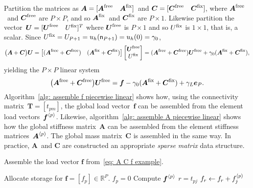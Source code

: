 Partition the matrices as
$\boldsymbol{A}=[\boldsymbol{A}^{\mathrm{free}}\quad\boldsymbol{A}^{\mathrm{fix}}]$~and
$\boldsymbol{C}=[\boldsymbol{C}^{\mathrm{free}}\quad\boldsymbol{C}^{\mathrm{fix}}]$, where
$\boldsymbol{A}^{\mathrm{free}}$~and $\boldsymbol{C}^{\mathrm{free}}$ are $P\times P$, and so
$\boldsymbol{A}^{\mathrm{fix}}$~and $\boldsymbol{C}^{\mathrm{fix}}$ are $P\times1$.  Likewise
partition the vector~$\boldsymbol{U}=[\boldsymbol{U}^{\mathrm{free}}\quad U^{\mathrm{fix}}]^T$ where
$\boldsymbol{U}^{\mathrm{free}}$ is $P\times1$ and so $U^{\mathrm{fix}}$ is $1\times1$, that is, a
scalar.  Since $U^{\mathrm{fix}}=U_{P+1}=u_h(\mathsf{n}_{P+1})=u_h(0)=\gamma_0$,
\[
\bigl(\boldsymbol{A}+\boldsymbol{C}\bigr)\boldsymbol{U}
    =\bigl[(\boldsymbol{A}^{\mathrm{free}}+\boldsymbol{C}^{\mathrm{free}})\quad
    (\boldsymbol{A}^{\mathrm{fix}}+\boldsymbol{C}^{\mathrm{fix}})\bigr]
    \begin{bmatrix}\boldsymbol{U}^{\mathrm{free}}\\ U^{\mathrm{fix}}\end{bmatrix}
    =(\boldsymbol{A}^{\mathrm{free}}+\boldsymbol{C}^{\mathrm{free}})\boldsymbol{U}^{\mathrm{free}}
    +\gamma_0(\boldsymbol{A}^{\mathrm{fix}}+\boldsymbol{C}^{\mathrm{fix}}),
\]
yielding the $P\times P$ linear system
\begin{equation}\label{eq: FEM 1d mixed linear system}
\bigl(\boldsymbol{A}^{\mathrm{free}}+\boldsymbol{C}^{\mathrm{free}}\bigr)\boldsymbol{U}^{\mathrm{free}}
=\boldsymbol{f}-\gamma_0(\boldsymbol{A}^{\mathrm{fix}}+\boldsymbol{C}^{\mathrm{fix}})
    +\gamma_L\boldsymbol{e}_P.
\end{equation}
Algorithm~\ref{alg: assemble f piecewise linear} shows how, using the 
connectivity matrix~$\boldsymbol{T}=[t_{pm}]$, the global load 
vector~$\boldsymbol{f}$ can be assembled from the element load 
vectors~$\boldsymbol{f}^{\langle p\rangle}$.  Likewise, 
algorithm~\ref{alg: assemble A piecewise linear} shows how the global 
stiffness matrix~$\boldsymbol{A}$ can be assembled from the element stiffness 
matrices~$\boldsymbol{A}^{\langle p\rangle}$.  The global mass matrix~$\boldsymbol{C}$ is 
assembled in the same way. In practice, $\boldsymbol{A}$~and $\boldsymbol{C}$ 
are constructed an appropriate \emph{sparse matrix} data structure.

\begin{algorithm}
\caption{Assemble the load vector $\boldsymbol{f}$
from~\eqref{eq: A C f example}.}
\label{alg: assemble f piecewise linear}
\begin{algorithmic}
\State Allocate storage for $\boldsymbol{f}=[f_p]\in\mathbb{R}^P$.
    \State $f_p=0$
\EndFor
{}
    \State Compute $\boldsymbol{f}^{\langle p\rangle}$
        \State $r=t_{pj}$
            \State $f_r\gets f_r+f^{\langle p\rangle}_j$
        \EndIf
    \EndFor
\EndFor
\end{algorithmic}
\end{algorithm}

